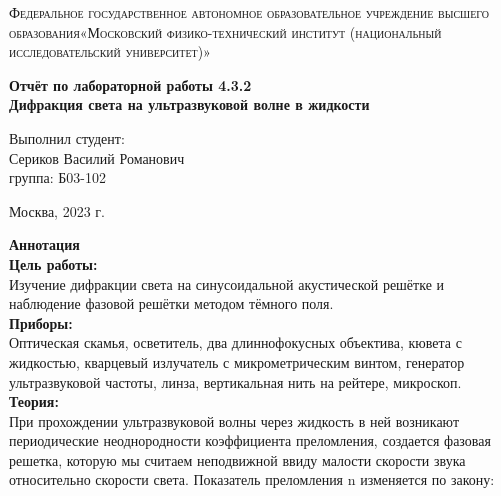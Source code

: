 \documentclass[a4paper, 12pt]{article}%
\begin{document}
	\begin{titlepage}
		\begin{center}
			\textsc{Федеральное государственное автономное образовательное учреждение высшего образования«Московский физико-технический институт (национальный исследовательский университет)»\\[5mm]
			}
			
			\vfill
			
			\textbf{Отчёт по лабораторной работы 4.3.2\\[3mm]
				Дифракция света на ультразвуковой волне
				в жидкости
				\\[50mm]
			}
			
		\end{center}
		
		\hfill
		\begin{minipage}{.5\textwidth}
			Выполнил студент:\\[2mm]
			Сериков Василий Романович\\[2mm]
			группа: Б03-102\\[5mm]
			
		\end{minipage}
		\vfill
		\begin{center}
			Москва, 2023 г.
		\end{center}
		
	\end{titlepage}
	
	\newpage
	\setcounter{page}{2}
	\textbf{Аннотация}\\
	
	\textbf{Цель работы: }\\
	
	Изучение дифракции света на синусоидальной акустической решётке и наблюдение фазовой решётки методом тёмного
	поля.\\
	
	\textbf{Приборы: }\\
	
	Оптическая скамья, осветитель, два длиннофокусных объектива, кювета с жидкостью, кварцевый излучатель
	с микрометрическим винтом, генератор ультразвуковой частоты, линза, вертикальная нить на рейтере, микроскоп.\\
	
	\textbf{Теория: }\\
	
	При прохождении ультразвуковой волны через жидкость в ней возникают периодические неоднородности коэффициента преломления, создается фазовая решетка, которую мы считаем неподвижной ввиду малости скорости звука относительно скорости света. Показатель
	преломления n изменяется по закону:
	
\end{document}
